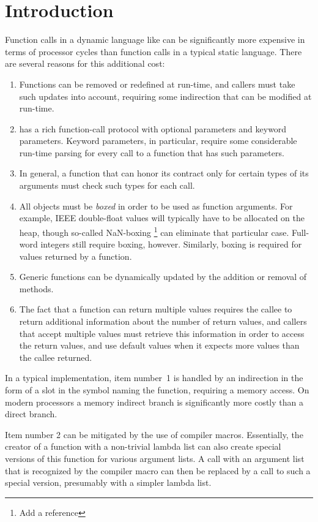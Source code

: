 \section{Introduction}
\label{sec-introduction}

Function calls in a dynamic language like \commonlisp{} can be
significantly more expensive in terms of processor cycles than
function calls in a typical static language.  There are several
reasons for this additional cost:

\begin{enumerate}
\item Functions can be removed or redefined at run-time, and callers
  must take such updates into account, requiring some indirection that
  can be modified at run-time.
\item \commonlisp{} has a rich function-call protocol with optional
  parameters and keyword parameters.  Keyword parameters, in
  particular, require some considerable run-time parsing for every
  call to a function that has such parameters.
\item In general, a function that can honor its contract only for
  certain types of its arguments must check such types for each call.
\item All objects must be \emph{boxed} in order to be used as function
  arguments.  For example, IEEE double-float values will typically
  have to be allocated on the heap, though so-called NaN-boxing%
  \footnote{Add a reference} can eliminate that particular case.
  Full-word integers still require boxing, however.  Similarly, boxing
  is required for values returned by a function.
\item Generic functions can be dynamically updated by the addition or
  removal of methods.
\item The fact that a function can return multiple values requires the
  callee to return additional information about the number of
  return values, and callers that accept multiple values must retrieve
  this information in order to access the return values, and use
  default values when it expects more values than the callee
  returned.
\end{enumerate}

In a typical \commonlisp{} implementation, item number~1 is handled by
an indirection in the form of a slot in the symbol naming the
function, requiring a memory access.  On modern processors a memory
indirect branch is significantly more costly than a direct branch.

Item number 2 can be mitigated by the use of compiler macros.
Essentially, the creator of a function with a non-trivial lambda list
can also create special versions of this function for various argument
lists.  A call with an argument list that is recognized by the
compiler macro can then be replaced by a call to such a special
version, presumably with a simpler lambda list.

